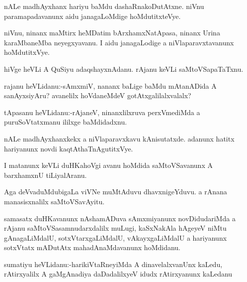\documentclass{article}
\begin{document}
\begin{mn}%
nALe madhAyxhanx hariyu baMdu dashaRnakoDutAtxne. niVnu paramapadavanunx aidu 
janagaLoMdige hoMdutitxteVye.
\end{mn}

\begin{mn}%
niVnu, ninanx maMtirx heMDatim bArxhamxNatApasa, ninanx Urina karaMbaneMba neyegxyavanu. I 
aidu janagaLodige a niVlaparavxtavanunx hoMdutitxVye.
\end{mn}

\begin{mn}%
hiVge heVLi A QuSiyu adaqshayxnAdanu. rAjanu keVLi saMtoVSapaTaTxnu.
\end{mn}

\begin{mn}%
rajanu heVLidanu:-sAmxmiV, nananx baLige baMdu mAtanADida A sanAyxsiyAru? avanelilx 
hoVdaneMdeV gotAtxgalilalxvalalx?
\end{mn}

\begin{mn}%
tApasanu heVLidanu:-rAjaneV, ninanxlilxruva perxVmediMda a puruSoVtatxmanu ililxge 
baMdidadxnu.
\end{mn}

\begin{mn}%
nALe madhAyxhanxkekx a niVlaparavxkavu kAnisutatxde. adanunx hatitx hariyanunx novdi 
kaqtAthaTnAgutitxVye.
\end{mn}

\begin{mn}%
I matanunx keVLi duHKahoVgi avanu hoMdida saMtoVSavanunx A barxhamxnU tiLiyalAranu.
\end{mn}

\begin{mn}%
Aga deVvaduMdubigaLa viVNe muMtAduvu dhavxnigeYduvu. a rAnana manasisxnalilx saMtoVSavAyitu.
\end{mn}

\begin{mn}%
samasatx duHKavanunx nAshamADuva sAmxmiyanunx novDidudariMda a rAjanu 
saMtoVSasamnudarxdalilx muLugi, kaSxNakAla hAgeyeV niMtu gAnagaLiMdalU, 
sotxVtarxgaLiMdalU, vAkayxgaLiMdalU a hariyanunx sotxVtatx mADutAtx mahadAnaMdavanunx 
hoMdidanu.
\end{mn}


\begin{mn}%
sumatiyu heVLidanu:-harikiVtaRneyiMda A dinavelalxvanUnx kaLedu, rAtirxyalilx A 
gaMgAnadiya daDadalilxyeV idudx rAtirxyanunx kaLedanu
\end{mn}
\end{document}
